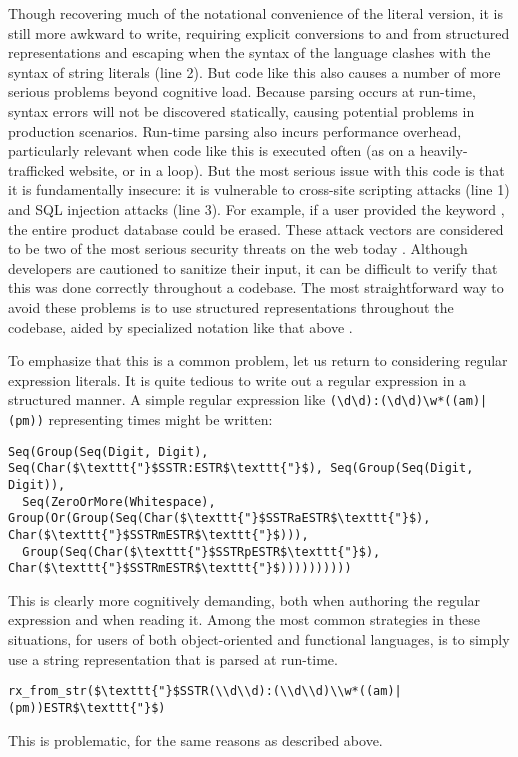 Though recovering much of the notational convenience of the literal version, it is still more awkward to write, requiring explicit conversions to and from structured representations and escaping when the syntax of the language clashes with the syntax of string literals (line 2). But code like this also causes a number of more serious problems beyond cognitive load. Because parsing occurs at run-time, syntax errors will not be discovered statically, causing potential problems in production scenarios. Run-time parsing also incurs performance overhead, particularly relevant when code like this is executed often (as on a heavily-trafficked website, or in a loop). But the most serious issue with this code is that it is fundamentally insecure: it is vulnerable to cross-site scripting attacks (line 1) and SQL injection attacks (line 3). For example, if a user provided the keyword , the entire product database could be erased. These attack vectors are considered to be two of the most serious security threats on the web today \cite{owasp2013}. Although developers are cautioned to sanitize their input, it can be difficult to verify that this was done correctly throughout a codebase. The most straightforward way to avoid these problems is to use structured representations throughout the codebase, aided by specialized notation like that above \cite{Bravenboer:2007:PIA:1289971.1289975}.

To emphasize that this is a common problem, let us return to considering regular expression literals. It is quite tedious to write out a regular expression in a structured manner. A simple regular expression like \verb!(\d\d):(\d\d)\w*((am)|(pm))! representing times might be written:
\begin{lstlisting}
Seq(Group(Seq(Digit, Digit), Seq(Char($\texttt{"}$SSTR:ESTR$\texttt{"}$), Seq(Group(Seq(Digit, Digit)), 
  Seq(ZeroOrMore(Whitespace), Group(Or(Group(Seq(Char($\texttt{"}$SSTRaESTR$\texttt{"}$), Char($\texttt{"}$SSTRmESTR$\texttt{"}$))), 
  Group(Seq(Char($\texttt{"}$SSTRpESTR$\texttt{"}$), Char($\texttt{"}$SSTRmESTR$\texttt{"}$))))))))))
\end{lstlisting}
This is clearly more cognitively demanding, both when authoring the regular expression and when reading it. Among the most common strategies in these situations, for users of both object-oriented and functional languages, is to simply use a string representation that is parsed at run-time.
\begin{lstlisting}
rx_from_str($\texttt{"}$SSTR(\\d\\d):(\\d\\d)\\w*((am)|(pm))ESTR$\texttt{"}$)
\end{lstlisting}
This is problematic, for the same reasons as described above. 

